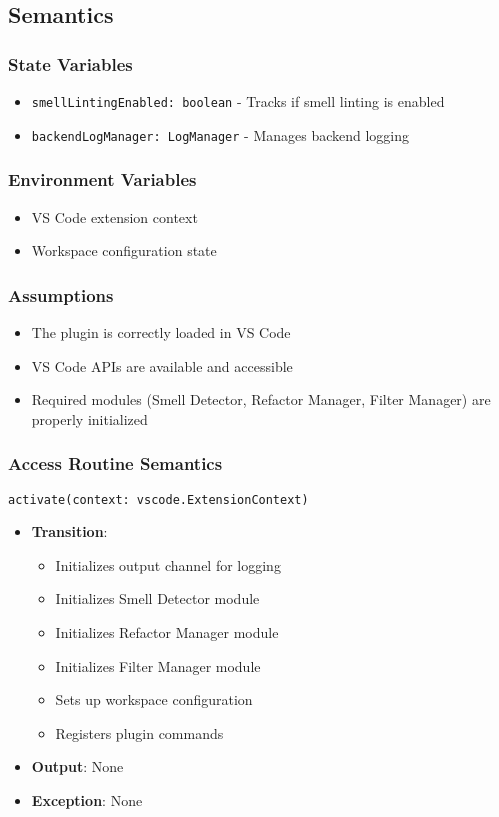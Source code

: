 \documentclass[12pt, titlepage]{article}
\begin{document}
\subsection{Semantics}

\subsubsection{State Variables}
\begin{itemize}
    \item \texttt{smellLintingEnabled: boolean} - Tracks if smell linting is enabled
    \item \texttt{backendLogManager: LogManager} - Manages backend logging
\end{itemize}

\subsubsection{Environment Variables}
\begin{itemize}
    \item VS Code extension context
    \item Workspace configuration state
\end{itemize}

\subsubsection{Assumptions}
\begin{itemize}
    \item The plugin is correctly loaded in VS Code
    \item VS Code APIs are available and accessible
    \item Required modules (Smell Detector, Refactor Manager, Filter Manager) are properly initialized
\end{itemize}

\subsubsection{Access Routine Semantics}

\noindent\texttt{activate(context: vscode.ExtensionContext)}
\begin{itemize}
    \item \textbf{Transition}: 
    \begin{itemize}
        \item Initializes output channel for logging
        \item Initializes Smell Detector module
        \item Initializes Refactor Manager module
        \item Initializes Filter Manager module
        \item Sets up workspace configuration
        \item Registers plugin commands
    \end{itemize}
    \item \textbf{Output}: None
    \item \textbf{Exception}: None
\end{itemize}
\end{document}
